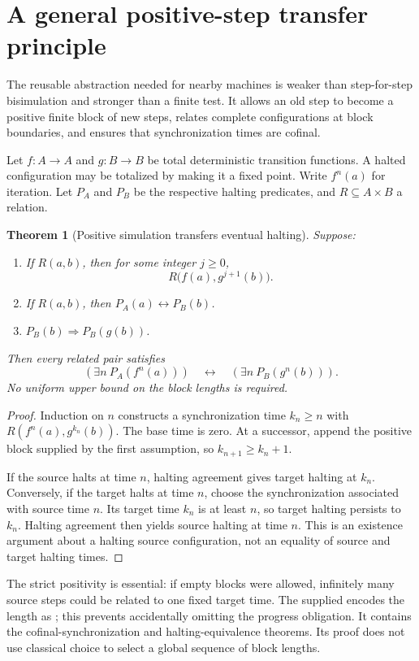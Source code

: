 \documentclass[11pt]{article}
\newtheorem{theorem}{Theorem}[section]
\newcommand{\code}[1]{\texttt{\detokenize{#1}}}
\begin{document}
\section{A general positive-step transfer principle}

The reusable abstraction needed for nearby machines is weaker than step-for-step bisimulation and stronger than a finite test. It allows an old step to become a positive finite block of new steps, relates complete configurations at block boundaries, and ensures that synchronization times are cofinal.

Let $f:A\to A$ and $g:B\to B$ be total deterministic transition functions. A halted configuration may be totalized by making it a fixed point. Write $f^n(a)$ for iteration. Let $P_A$ and $P_B$ be the respective halting predicates, and $R\subseteq A\times B$ a relation.

\begin{theorem}[Positive simulation transfers eventual halting]
Suppose:
\begin{enumerate}
\item If $R(a,b)$, then for some integer $j\geq0$,
\[
 R\bigl(f(a),g^{j+1}(b)\bigr).
\]
\item If $R(a,b)$, then $P_A(a)\leftrightarrow P_B(b)$.
\item $P_B(b)\Rightarrow P_B(g(b))$.
\end{enumerate}
Then every related pair satisfies
\[
 (\exists n\ P_A(f^n(a)))\quad\longleftrightarrow\quad
 (\exists n\ P_B(g^n(b))).
\]
No uniform upper bound on the block lengths is required.
\end{theorem}

\begin{proof}
Induction on $n$ constructs a synchronization time $k_n\geq n$ with
$R(f^n(a),g^{k_n}(b))$. The base time is zero. At a successor, append the positive block supplied by the first assumption, so $k_{n+1}\geq k_n+1$.

If the source halts at time $n$, halting agreement gives target halting at $k_n$. Conversely, if the target halts at time $n$, choose the synchronization associated with source time $n$. Its target time $k_n$ is at least $n$, so target halting persists to $k_n$. Halting agreement then yields source halting at time $n$. This is an existence argument about a halting source configuration, not an equality of source and target halting times.
\end{proof}

The strict positivity is essential: if empty blocks were allowed, infinitely many source steps could be related to one fixed target time. The supplied \code{PositiveSimulation.lean} encodes the length as \code{j + 1}; this prevents accidentally omitting the progress obligation. It contains the cofinal-synchronization and halting-equivalence theorems. Its proof does not use classical choice to select a global sequence of block lengths.
\end{document}
